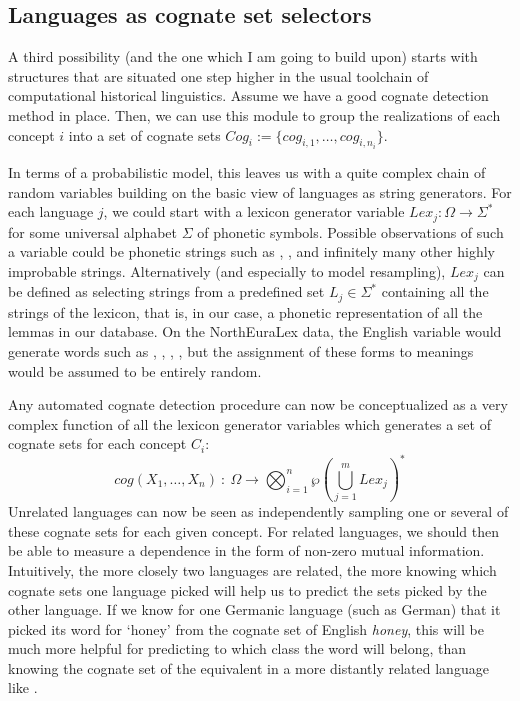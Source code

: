 \subsection{Languages as cognate set selectors}
A third possibility (and the one which I am going to build upon) starts with structures that are situated one step higher in the usual toolchain of computational historical linguistics. Assume we have a good cognate detection method in place. Then, we can use this module to group the realizations of each concept $i$ into a set of cognate sets $Cog_i := \{cog_{i,1}, \dots, cog_{i,n_{i}}\}$.

In terms of a probabilistic model, this leaves us with a quite complex chain of random variables building on the basic view of languages as string generators. For each language $j$, we could start with a lexicon generator variable $Lex_j \colon \Omega \rightarrow \Sigma^*$ for some universal alphabet $\Sigma$ of phonetic symbols. Possible observations of such a variable could be phonetic strings such as \ipa{[\ae\ae\ae]}, \ipa{[ktk@@N]}, and infinitely many other highly improbable strings. Alternatively (and especially to model resampling), $Lex_j$ can be defined as selecting strings from a predefined set $L_j \in \Sigma^*$ containing all the strings of the lexicon, that is, in our case, a phonetic representation of all the lemmas in our database. On the NorthEuraLex data, the English variable would generate words such as \ipa{[taUn]}, \ipa{[fi:v@]}, \ipa{[hEvI]}, \ipa{[aI]}, but the assignment of these forms to meanings would be assumed to be entirely random.

Any automated cognate detection procedure can now be conceptualized as a very complex function of all the lexicon generator variables which generates a set of cognate sets for each concept $C_i$:
\begin{equation}
 cog(X_1,\dots,X_n)\ \colon\ \Omega \rightarrow \bigotimes_{i = 1}^{n} \wp\left(\bigcup_{j=1}^{m} Lex_j\right)^*
\end{equation}
Unrelated languages can now be seen as independently sampling one or several of these cognate sets for each given concept. For related languages, we should then be able to measure a dependence in the form of non-zero mutual information. Intuitively, the more closely two languages are related, the more knowing which cognate sets one language picked will help us to predict the sets picked by the other language. If we know for one Germanic language (such as German) that it picked its word for `honey' from the cognate set of English \textit{honey}, this will be much more helpful for predicting to which class the  word will belong, than knowing the cognate set of the equivalent in a more distantly related language like .

